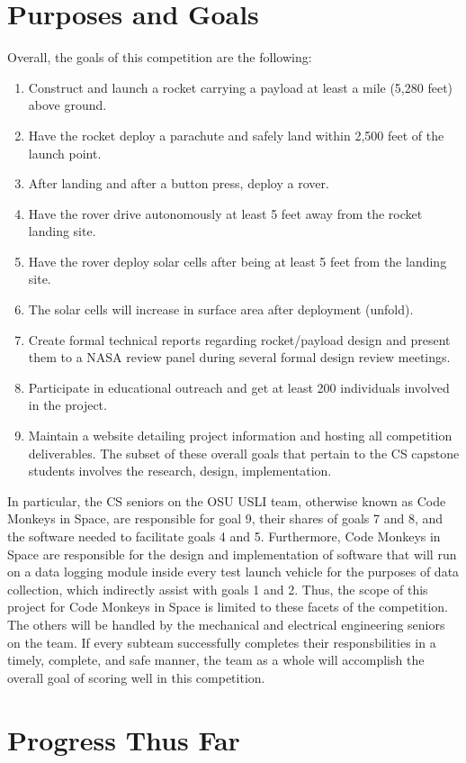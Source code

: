 \documentclass[onecolumn, draftclsnofoot,10pt, compsoc]{IEEEtran}
\begin{document}
\section{Purposes and Goals}
Overall, the goals of this competition are the following:
\begin{enumerate}
\item Construct and launch a rocket carrying a payload at least a mile (5,280 feet) above ground.
\item Have the rocket deploy a parachute and safely land within 2,500 feet of the launch point.
\item After landing and after a button press, deploy a rover.
\item Have the rover drive autonomously at least 5 feet away from the rocket landing site.
\item Have the rover deploy solar cells after being at least 5 feet from the landing site.
\item The solar cells will increase in surface area after deployment (unfold).
\item Create formal technical reports regarding rocket/payload design and present them to a NASA review panel
during several formal design review meetings.
\item Participate in educational outreach and get at least 200 individuals involved in the project.
\item Maintain a website detailing project information and hosting all competition deliverables.
The subset of these overall goals that pertain to the CS capstone students involves the research, design, implementation.
\end{enumerate}
In particular, the CS seniors on the OSU USLI team, otherwise known as Code Monkeys in Space, are responsible for goal 9, their shares of goals 7 and 8, and the software needed to facilitate goals 4 and 5. Furthermore, Code Monkeys in Space are responsible for the design and implementation of software that will run on a data logging module inside every test launch vehicle for the purposes of data collection, which indirectly assist with goals 1 and 2. Thus, the scope of this project for Code Monkeys in Space is limited to these facets of the competition. The others will be handled by the mechanical and electrical engineering seniors on the team. If every subteam successfully completes their responsbilities in a timely, complete, and safe manner, the team as a whole will accomplish the overall goal of scoring well in this competition.
\section{Progress Thus Far}
\end{document}
